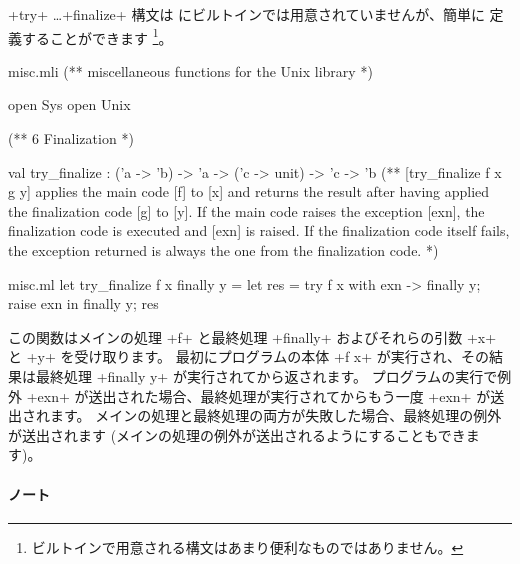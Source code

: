 \ml+try+ \ldots \ml+finalize+ 構文は \ocaml にビルトインでは用意されていませんが、簡単に
定義することができます \footnote{ビルトインで用意される構文はあまり便利なものではありません。}。
\begin{codefile}{misc.mli}
(** miscellaneous functions for the Unix library *)

open Sys
open Unix

(** {6 Finalization} *)

val try_finalize : ('a -> 'b) -> 'a -> ('c -> unit) -> 'c -> 'b
(** [try_finalize f x g y] applies the main code [f] to [x] and
   returns the result after having applied the finalization
   code [g] to [y]. If the main code raises the exception
   [exn], the finalization code is executed and [exn] is raised.
   If the finalization code itself fails, the exception
   returned is always the one from the finalization code. *)
\end{codefile}
%
\begin{listingcodefile}{misc.ml}
let try_finalize f x finally y =
  let res = try f x with exn -> finally y; raise exn in
  finally y;
  res
\end{listingcodefile}
%
この関数はメインの処理 \ml+f+ と最終処理 \ml+finally+ およびそれらの引数 \ml+x+ と \ml+y+ を受け取ります。
最初にプログラムの本体 \ml+f x+ が実行され、その結果は最終処理 \ml+finally y+ が実行されてから返されます。
プログラムの実行で例外 \ml+exn+ が送出された場合、最終処理が実行されてからもう一度 \ml+exn+ が送出されます。
メインの処理と最終処理の両方が失敗した場合、最終処理の例外が送出されます (メインの処理の例外が送出されるようにすることもできます)。


\paragraph{ノート}

